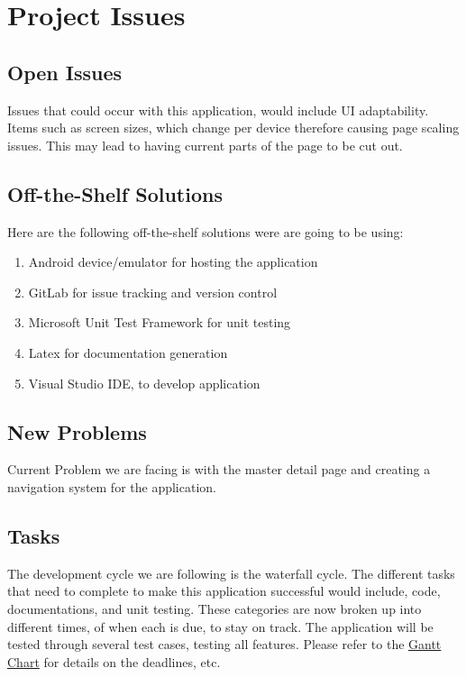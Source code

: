 \documentclass[12pt, titlepage]{article}
\begin{document}
\section{Project Issues}

\subsection{Open Issues}
Issues that could occur with this application, would include UI adaptability. Items such as screen sizes, which change per device therefore causing page scaling issues. This may lead to having current parts of the page to be cut out. 

\subsection{Off-the-Shelf Solutions}
Here are the following off-the-shelf solutions were are going to be using:  %
   \begin{enumerate}
     \item Android device/emulator for hosting the application 
     \item GitLab for issue tracking and version control
	\item Microsoft Unit Test Framework for unit testing 
	 \item Latex for documentation generation
	\item Visual Studio IDE, to develop application

   \end{enumerate}

\subsection{New Problems}
Current Problem we are facing is with the master detail page and creating a navigation system for the application.
\subsection{Tasks}
The development cycle we are following is the waterfall cycle. The different tasks that need to complete to make this application successful would include, code, documentations, and unit testing. These categories are now broken up into different times, of when each is due, to stay on track. The application will be tested through several test cases, testing all features. Please refer to the \href{run:../../ProjectSchedule/3X_Example.gann}{Gantt Chart} for details on the deadlines, etc.
\end{document}
